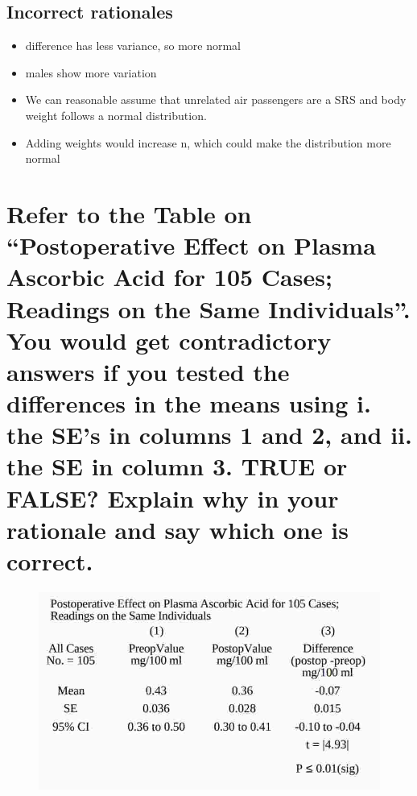 \documentclass[letterpaper,9pt,twoside,printwatermark=false]{pinp}
\providecommand{\tightlist}{%
  \setlength{\itemsep}{0pt}\setlength{\parskip}{0pt}}
\begin{document}
\subsection{Incorrect rationales}\label{incorrect-rationales-1}

\begin{itemize}
\tightlist
\item
  difference has less variance, so more normal
\item
  males show more variation
\item
  We can reasonable assume that unrelated air passengers are a SRS and
  body weight follows a normal distribution.
\item
  Adding weights would increase n, which could make the distribution
  more normal
\end{itemize}

\section{\texorpdfstring{Refer to the Table on ``Postoperative Effect on
Plasma Ascorbic Acid for 105 Cases; Readings on the Same Individuals''.
You would get contradictory answers if you tested the differences in the
means using i. the SE's in columns 1 and 2, and ii. the SE in column 3.
TRUE or FALSE? Explain why in your rationale and say which one is
correct.}{Refer to the Table on Postoperative Effect on Plasma Ascorbic Acid for 105 Cases; Readings on the Same Individuals. You would get contradictory answers if you tested the differences in the means using i. the SE's in columns 1 and 2, and ii. the SE in column 3. TRUE or FALSE? Explain why in your rationale and say which one is correct.}}\label{refer-to-the-table-on-postoperative-effect-on-plasma-ascorbic-acid-for-105-cases-readings-on-the-same-individuals.-you-would-get-contradictory-answers-if-you-tested-the-differences-in-the-means-using-i.-the-ses-in-columns-1-and-2-and-ii.-the-se-in-column-3.-true-or-false-explain-why-in-your-rationale-and-say-which-one-is-correct.}

\begin{figure}
\centering
\includegraphics[scale=0.5]{tab3.jpg}
\end{figure}
\end{document}
